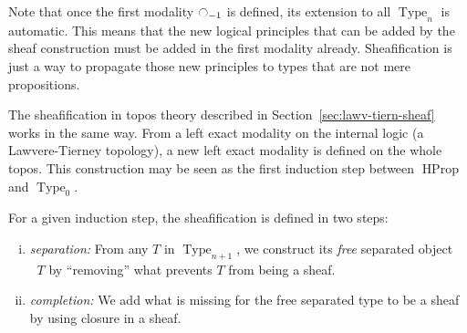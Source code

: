 \documentclass[conference]{IEEEtran}
\newcommand{\mynote}[2]{
    \fbox{\bfseries\sffamily\scriptsize#1}
    {\small$\blacktriangleright$\textsf{\emph{#2}}$\blacktriangleleft$}~}
\newcommand\kq[1]{\mynote{KQ}{#1}}
\DeclareMathOperator{\Type}{Type}
\DeclareMathOperator{\HProp}{HProp}
\newcommand{\modal}{\ensuremath{\ocircle}}
\newcommand \separated {\mathop{\square_{n+1}} }
\begin{document}
Note that once the first modality $\modal_{-1}$ is defined, its
extension to all $\Type_n$ is automatic. This means that the new
logical principles that can be added by the sheaf construction must be
added in the first modality already. Sheafification is just a way
to propagate those new principles to types that are not mere
propositions.





The sheafification in topos theory described in
Section~\ref{sec:lawv-tiern-sheaf} works in the same way. 
%
From a left exact modality on the internal logic (a Lawvere-Tierney
topology), a new left exact modality is defined on the whole topos.
%
This construction may be seen as the first induction step between
$\HProp$ and $\Type_0$. 


For a given induction step, the sheafification is defined in two
steps:
%
\begin{enumerate}[(i)]
\item {\em separation:} From any $T$ in $\Type_{n+1}$, we construct
  its {\em free} separated object $\separated T$ by ``removing'' what
  prevents $T$ from being a sheaf.
\item {\em completion:} We add what is missing for the free 
  separated type to be a sheaf by using closure in a sheaf.
\end{enumerate}



\end{document}
